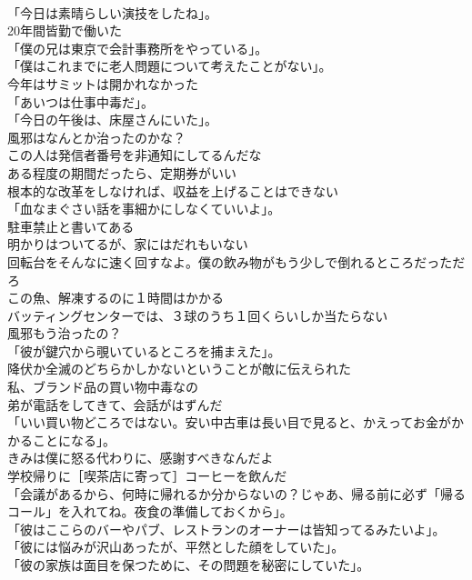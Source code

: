 \documentclass[8pt]{extreport}
\begin{document}
\begin{CJK}{UTF8}{min}
\\	「今日は素晴らしい演技をしたね」。	
\\	20年間皆勤で働いた	
\\	「僕の兄は東京で会計事務所をやっている」。	
\\	「僕はこれまでに老人問題について考えたことがない」。	
\\	今年はサミットは開かれなかった	
\\	「あいつは仕事中毒だ」。	
\\	「今日の午後は、床屋さんにいた」。	
\\	風邪はなんとか治ったのかな？	
\\	この人は発信者番号を非通知にしてるんだな	
\\	ある程度の期間だったら、定期券がいい	
\\	根本的な改革をしなければ、収益を上げることはできない	
\\	「血なまぐさい話を事細かにしなくていいよ」。	
\\	駐車禁止と書いてある	
\\	明かりはついてるが、家にはだれもいない	
\\	回転台をそんなに速く回すなよ。僕の飲み物がもう少しで倒れるところだっただろ	
\\	この魚、解凍するのに１時間はかかる	
\\	バッティングセンターでは、３球のうち１回くらいしか当たらない	
\\	風邪もう治ったの？	
\\	「彼が鍵穴から覗いているところを捕まえた」。	
\\	降伏か全滅のどちらかしかないということが敵に伝えられた	
\\	私、ブランド品の買い物中毒なの	
\\	弟が電話をしてきて、会話がはずんだ	
\\	「いい買い物どころではない。安い中古車は長い目で見ると、かえってお金がかかることになる」。	
\\	きみは僕に怒る代わりに、感謝すべきなんだよ	
\\	学校帰りに［喫茶店に寄って］コーヒーを飲んだ	
\\	「会議があるから、何時に帰れるか分からないの？じゃあ、帰る前に必ず「帰るコール」を入れてね。夜食の準備しておくから」。	
\\	「彼はここらのバーやパブ、レストランのオーナーは皆知ってるみたいよ」。	
\\	「彼には悩みが沢山あったが、平然とした顔をしていた」。 
\\	「彼の家族は面目を保つために、その問題を秘密にしていた」。	

\end{CJK}
\end{document}
